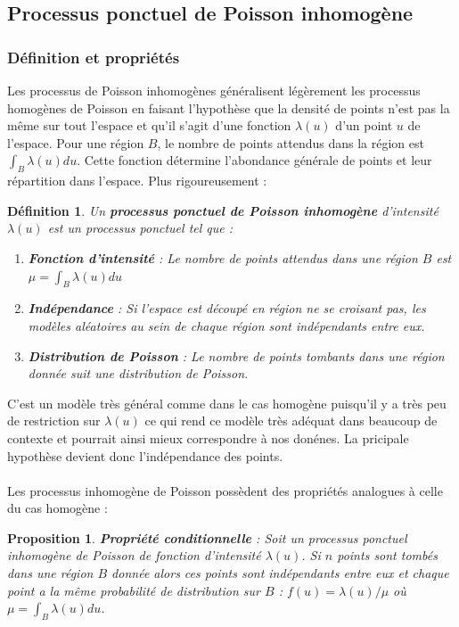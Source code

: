 \documentclass[12pt]{article}
\newtheorem{prop1}[thm1]{Proposition}
\newtheorem*{defin1}{Définition}
\begin{document}
\subsection{Processus ponctuel de Poisson inhomogène}
\subsubsection*{Définition et propriétés}
Les processus de Poisson inhomogènes généralisent légèrement les processus homogènes de Poisson en faisant l'hypothèse que la densité de points n'est pas la même sur tout l'espace et qu'il s'agit d'une fonction $\lambda(u)$ d'un point $u$ de l'espace. Pour une région $B$, le nombre de points attendus dans la région est $\int_B \lambda(u) du$. Cette fonction détermine l'abondance générale de points et leur répartition dans l'espace. Plus rigoureusement :

\begin{defin1}
Un \textbf{processus ponctuel de Poisson inhomogène} d'intensité $\lambda(u)$ est un processus ponctuel tel que :
\begin{enumerate}
    \item \textbf{Fonction d'intensité} : Le nombre de points attendus dans une région $B$ est $\mu = \int_B \lambda(u) du$\\
    \item \textbf{Indépendance} : Si l'espace est découpé en région ne se croisant pas, les modèles aléatoires au sein de chaque région sont indépendants entre eux.\\
    \item \textbf{Distribution de Poisson} : Le nombre de points tombants dans une région donnée suit une distribution de Poisson.
\end{enumerate}
\end{defin1}
C'est un modèle très général comme dans le cas homogène puisqu'il y a très peu de restriction sur $\lambda(u)$ ce qui rend ce modèle très adéquat dans beaucoup de contexte et pourrait ainsi mieux correspondre à nos donénes. La pricipale hypothèse devient donc l'indépendance des points.\\
\\
Les processus inhomogène de Poisson possèdent des propriétés analogues à celle du cas homogène :

\begin{prop1}
    \textbf{Propriété conditionnelle} : Soit un processus ponctuel inhomogène de Poisson de fonction d'intensité $\lambda(u)$. Si $n$ points sont tombés dans une région $B$ donnée alors ces points sont indépendants entre eux et chaque point a la même probabilité de distribution sur $B$ : $f(u) = \lambda(u)/\mu$ où $\mu = \int_B \lambda(u) du$.
\end{prop1}
\end{document}
